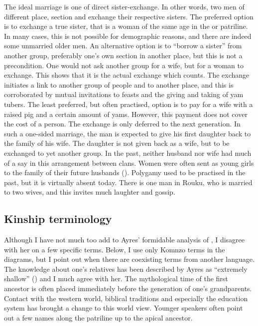 The ideal marriage is one of direct sister-exchange. In other words, two men of different place, section and  exchange their respective sisters. The preferred option is to exchange a true sister, that is a woman of the same age in the  or patriline. In many cases, this is not possible for demographic reasons, and there are indeed some unmarried older men. An alternative option is to ``borrow a sister'' from another group, preferably one's own section in another place, but this is not a precondition. One would not ask another group for a wife, but for a woman to exchange. This shows that it is the actual exchange which counts. The exchange initiates a link to another group of people and to another place, and this is corroborated by mutual invitations to feasts and the giving and taking of yam tubers. The least preferred, but often practised, option is to pay for a wife with a raised pig and a certain amount of yams. However, this payment does not cover the cost of a person. The exchange is only deferred to the next generation. In such a one-sided marriage, the man is expected to give his first daughter back to the family of his wife. The daughter is not given back as a wife, but to be exchanged to yet another group. In the past, neither husband nor wife had much of a say in this arrangement between clans. Women were often sent as young girls to the family of their future husbands (\citealt[145]{Williams:1936transfly}). Polygamy used to be practised in the past, but it is virtually absent today. There is one man in Rouku, who is married to two wives, and this invites much laughter and gossip.

\subsection{Kinship terminology}\label{kinterms}

Although I have not much too add to Ayres' formidable analysis of , I disagree with her on a few specific terms. Below, I use only Komnzo terms in the  diagrams, but I point out when there are coexisting terms from another language. The knowledge about one's relatives has been described by Ayres as ``extremely shallow'' (\citeyear[217]{Ayres:ws}) and I much agree with her. The mythological time of the first ancestor is often placed immediately before the generation of one's grandparents. Contact with the western world, biblical traditions and especially the education system has brought a change to this world view. Younger speakers often point out a few names along the patriline up to the apical ancestor.

